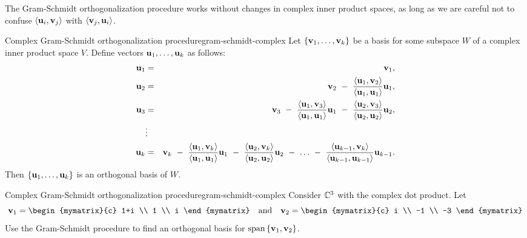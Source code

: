 The Gram-Schmidt orthogonalization procedure works without changes in
complex inner product spaces, as long as we are careful not to confuse
$\iprod{\vect{u}_i,\vect{v}_j}$ with $\iprod{\vect{v}_j,\vect{u}_i}$.

\begin{proposition}{Complex Gram-Schmidt orthogonalization procedure}{gram-schmidt-complex}
  Let $\set{\vect{v}_1,\ldots,\vect{v}_k}$ be a basis for some subspace $W$
  of a complex inner product space $V$.%
  Define vectors
  $\vect{u}_1,\ldots,\vect{u}_k$ as follows:
  \begin{eqnarray*}
    \vect{u}_1
    &=& \vect{v}_1,
    \\
    \vect{u}_2
    &=& \vect{v}_2
        ~-~ \frac{\iprod{\vect{u}_1,\vect{v}_2}}{\iprod{\vect{u}_1,\vect{u}_1}}\vect{u}_1,
    \\
    \vect{u}_3
    &=& \vect{v}_3
        ~-~ \frac{\iprod{\vect{u}_1,\vect{v}_3}}{\iprod{\vect{u}_1,\vect{u}_1}}\vect{u}_1
        ~-~ \frac{\iprod{\vect{u}_2,\vect{v}_3}}{\iprod{\vect{u}_2,\vect{u}_2}}\vect{u}_2,
    \\
    &\vdots&
    \\
    \vect{u}_k
    &=& \vect{v}_k
        ~-~ \frac{\iprod{\vect{u}_1,\vect{v}_k}}{\iprod{\vect{u}_1,\vect{u}_1}}\vect{u}_1
        ~-~ \frac{\iprod{\vect{u}_2,\vect{v}_k}}{\iprod{\vect{u}_2,\vect{u}_2}}\vect{u}_2
        ~-~ \ldots
        ~-~ \frac{\iprod{\vect{u}_{k-1},\vect{v}_k}}{\iprod{\vect{u}_{k-1},\vect{u}_{k-1}}}\vect{u}_{k-1}.
  \end{eqnarray*}
  Then $\set{\vect{u}_1,\ldots,\vect{u}_k}$ is an orthogonal basis of $W$.
\end{proposition}

\begin{example}{Complex Gram-Schmidt orthogonalization procedure}{gram-schmidt-complex}
  Consider $\mathbb{C}^3$ with the complex dot product. Let
  \begin{equation*}
    \vect{v}_1 = \begin{mymatrix}{c} 1+i \\ 1 \\ i \end{mymatrix}
    \quad\mbox{and}\quad
    \vect{v}_2 = \begin{mymatrix}{c} i \\ -1 \\ -3  \end{mymatrix}
  \end{equation*}
  Use the Gram-Schmidt procedure to find an orthogonal basis for
  $\sspan\set{\vect{v}_1,\vect{v}_2}$.
\end{example}

